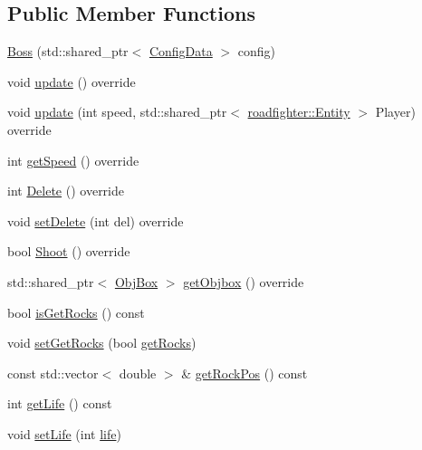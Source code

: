\subsection*{Public Member Functions}
\begin{DoxyCompactItemize}
\item 
\hyperlink{classroadfighter_1_1Boss_ae71359243be30ff532283b15be66bb70}{Boss} (std\+::shared\+\_\+ptr$<$ \hyperlink{classConfigData}{Config\+Data} $>$ config)
\item 
void \hyperlink{classroadfighter_1_1Boss_aa097f1f2e3fe76645233a4ba75ee6256}{update} () override
\item 
void \hyperlink{classroadfighter_1_1Boss_a1754fba639f122f50e3eeb55980008b2}{update} (int speed, std\+::shared\+\_\+ptr$<$ \hyperlink{classroadfighter_1_1Entity}{roadfighter\+::\+Entity} $>$ Player) override
\item 
int \hyperlink{classroadfighter_1_1Boss_a348151aa9aabb3baabf9a8cc0b6955cb}{get\+Speed} () override
\item 
int \hyperlink{classroadfighter_1_1Boss_a8ffadaa85b61447da023c043d3d2dcc9}{Delete} () override
\item 
void \hyperlink{classroadfighter_1_1Boss_a8e2d5737afc0df4bc8b8ad0ddc03f5b8}{set\+Delete} (int del) override
\item 
bool \hyperlink{classroadfighter_1_1Boss_a794027599b17398ae72c65aa1837d864}{Shoot} () override
\item 
std\+::shared\+\_\+ptr$<$ \hyperlink{structObjBox}{Obj\+Box} $>$ \hyperlink{classroadfighter_1_1Boss_a3cf68c683f4352908eab55fc6ee29e9e}{get\+Objbox} () override
\item 
bool \hyperlink{classroadfighter_1_1Boss_a87c3a59c31b8babf464711a69c74622d}{is\+Get\+Rocks} () const
\item 
void \hyperlink{classroadfighter_1_1Boss_a86ef044739f08440f8b63a17f3e60d01}{set\+Get\+Rocks} (bool \hyperlink{classroadfighter_1_1Boss_a276f3388ae889d5b9e32e4e68ecd8e55}{get\+Rocks})
\item 
const std\+::vector$<$ double $>$ \& \hyperlink{classroadfighter_1_1Boss_a9be5ed79ba9419881bb972ea9582b110}{get\+Rock\+Pos} () const
\item 
int \hyperlink{classroadfighter_1_1Boss_a06a715dad575e6e51f78be8c8c0836f7}{get\+Life} () const
\item 
void \hyperlink{classroadfighter_1_1Boss_a170c46fc7f03d6e59633c370c6fd478c}{set\+Life} (int \hyperlink{classroadfighter_1_1Boss_a176c004f982a1c1f75d18e980373bf61}{life})
\end{DoxyCompactItemize}
